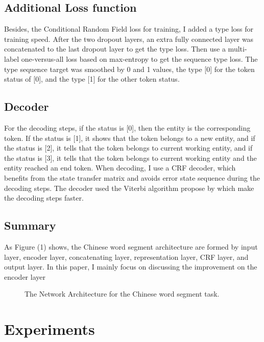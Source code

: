 \documentclass[11pt,a4paper]{article}
\begin{document}
\subsection{Additional Loss function}

Besides, the Conditional Random Field loss for training, I added a type loss for training speed.
After the two dropout layers, an extra fully connected layer was concatenated to the last dropout layer to get the type loss.
Then use a multi-label one-versus-all loss based on max-entropy to get the sequence type loss.
The type sequence target was smoothed by 0 and 1 values, the type [0] for the token status of [0], and the type [1] for the other token status.

\subsection{Decoder}

For the decoding steps, if the status is [0], then the entity is the corresponding token.
If the status is [1], it shows that the token belongs to a new entity, and if the status is [2], it tells that the token belongs to current working entity,
and if the status is [3], it tells that the token belongs to current working entity and the entity reached an end token.
When decoding, I use a CRF decoder, which benefits from the state transfer matrix and avoids error state sequence during the decoding steps.
The decoder used the Viterbi algorithm propose by \citet{forney1973viterbi} which make the decoding steps faster.

\subsection{Summary}

As Figure (1) shows, the Chinese word segment architecture are formed by input layer, encoder layer, concatenating layer, representation layer, CRF layer, and output layer.
In this paper, I mainly focus on discussing the improvement on the encoder layer
\begin{figure*}
\begin{center}
\end{center}
   \caption{The Network Architecture for the Chinese word segment task.}
\label{fig:short}
\end{figure*}

\section{Experiments}
\end{document}
